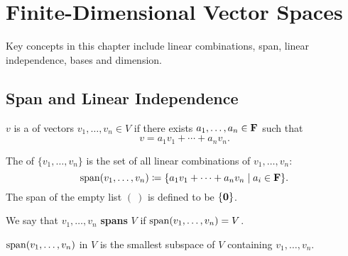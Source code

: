 \chapter{Finite-Dimensional Vector Spaces}\label{chap:finite-dim-vector-spaces}
Key concepts in this chapter include linear combinations, span, linear independence, bases and dimension.

\section{Span and Linear Independence}
\begin{definition}
$v$ is a  of vectors $v_1,\dots,v_n\in V$ if there exists $a_1,\dots,a_n\in\mathbf F$ such that
\[v=a_1v_1+\cdots+a_nv_n.\]
\end{definition}

\begin{definition}[Span]
The  of $\{v_1,\dots,v_n\}$ is the set of all linear combinations of $v_1,\dots,v_n$:
\[\operatorname{span}(v_1,\dots,v_n)\coloneqq\{a_1v_1+\cdots+a_nv_n\mid a_i\in\mathbf F\}.\]
The span of the empty list $(\:)$ is defined to be $\{\vb{0}\}$.

We say that $v_1,\dots,v_n$ \textbf{spans} $V$ if $\operatorname{span}(v_1,\dots,v_n)=V$.
\end{definition}

\begin{proposition}
$\operatorname{span}(v_1,\dots,v_n)$ in $V$ is the smallest subspace of $V$ containing $v_1,\dots,v_n$.
\end{proposition}

